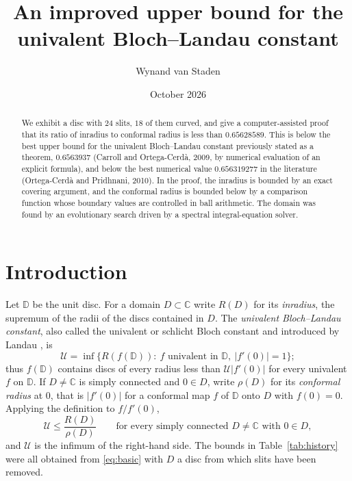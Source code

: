 \documentclass[11pt]{amsart}
\title[The univalent Bloch--Landau constant]{An improved upper bound for the univalent Bloch--Landau constant}
\author{Wynand van Staden}
\date{October 2026}
\theoremstyle{remark}
\newcommand{\U}{\mathcal U}
\newcommand{\D}{\mathbb D}
\newcommand{\C}{\mathbb C}
\begin{document}
\begin{abstract}
We exhibit a disc with $24$ slits, $18$ of them curved, and give a computer-assisted proof that its ratio of
inradius to conformal radius is less than $0.65628589$. This is below the best upper bound for the univalent
Bloch--Landau constant previously stated as a theorem, $0.6563937$ (Carroll and Ortega-Cerd\`a, 2009, by numerical
evaluation of an explicit formula), and below the best numerical value $0.656319277$ in the literature
(Ortega-Cerd\`a and Pridhnani, 2010). In the proof, the inradius is bounded by an exact covering argument, and the conformal radius is
bounded below by a comparison function whose boundary values are controlled in ball arithmetic.
The domain was found by an evolutionary search driven by a spectral integral-equation solver.
\end{abstract}


\maketitle

\section{Introduction}

Let $\D$ be the unit disc. For a domain $D\subset\C$ write $R(D)$ for its \emph{inradius}, the supremum of the
radii of the discs contained in $D$. The \emph{univalent Bloch--Landau constant}, also called the univalent or
schlicht Bloch constant and introduced by Landau \cite{Lan}, is
\[
\U=\inf\bigl\{R(f(\D)):\ f\text{ univalent in }\D,\ |f'(0)|=1\bigr\};
\]
thus $f(\D)$ contains discs of every radius less than $\U|f'(0)|$ for every univalent $f$ on $\D$.
If $D\ne\C$ is simply connected and $0\in D$, write $\rho(D)$ for its \emph{conformal radius} at $0$,
that is $|f'(0)|$ for a conformal map $f$ of $\D$ onto $D$ with $f(0)=0$. Applying the definition to $f/f'(0)$,
\begin{equation}\label{eq:basic}
\U\le\frac{R(D)}{\rho(D)}\qquad\text{for every simply connected }D\ne\C\text{ with }0\in D,
\end{equation}
and $\U$ is the infimum of the right-hand side. The bounds in Table~\ref{tab:history} were all obtained from
\eqref{eq:basic} with $D$ a disc from which slits have been removed.
\end{document}
